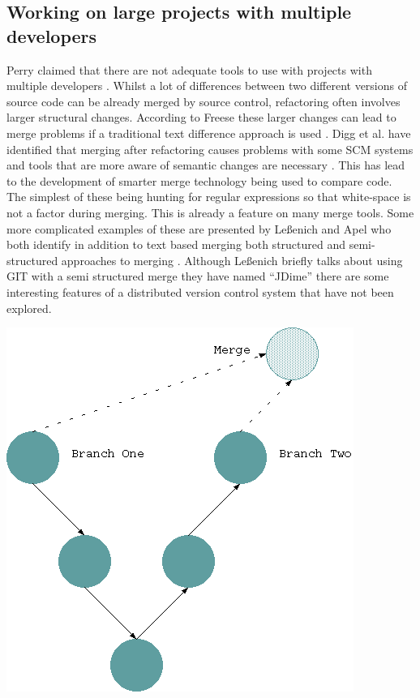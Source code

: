 \documentclass[12pt]{CRPITStyle}
\renewcommand{\cite}{\citep}
\begin{document}
\subsection{Working on large projects with multiple developers}
Perry claimed that there are not adequate tools to use with projects with multiple developers \cite{Perry2001}. Whilst a lot of differences between two different versions of source code can be already merged by source control, refactoring often involves larger structural changes. According to Freese these larger changes can lead to merge problems if a traditional text difference approach is used \cite{freese2007operation}. Digg et al. have identified that merging after refactoring causes problems with some SCM systems and tools that are more aware of semantic changes are necessary \cite{Dig2008}. This has lead to the development of smarter merge technology being used to compare code. The simplest of these being hunting for regular expressions so that white-space is not a factor during merging. This is already a feature on many merge tools. Some more complicated examples of these are presented by Le{\ss}enich and Apel who both identify in addition to text based merging both structured and semi-structured approaches to merging \cite{LeBenich2012} \cite{Apel2011}. Although Le{\ss}enich briefly talks about using GIT with a semi structured merge they have named ``JDime'' there are some interesting features of a distributed version control system that have not been explored.

\begin{center}
\includegraphics[scale=0.5]{git-diag}
\end{center}
\end{document}

